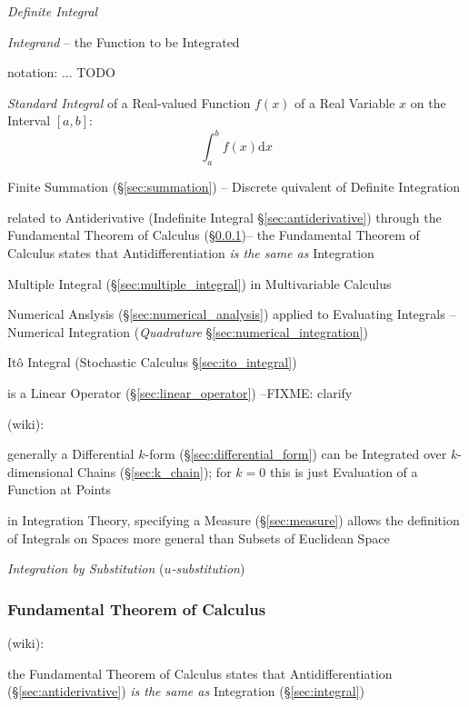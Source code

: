 \emph{Definite Integral}

\emph{Integrand} -- the Function to be Integrated

notation:
... TODO

\emph{Standard Integral} of a Real-valued Function $f(x)$ of a Real Variable $x$
on the Interval $[a,b]$:
\[
  \int_a^b f(x) \mathrm{d}x
\]

\fist Finite Summation (\S\ref{sec:summation}) -- Discrete quivalent of
Definite Integration

\fist related to Antiderivative (Indefinite Integral \S\ref{sec:antiderivative})
through the Fundamental Theorem of Calculus
(\S\ref{sec:fundamental_calculus_theorem})--
the Fundamental Theorem of Calculus states that Antidifferentiation \emph{is the
  same as} Integration

\fist Multiple Integral (\S\ref{sec:multiple_integral}) in Multivariable
Calculus

\fist Numerical Anslysis (\S\ref{sec:numerical_analysis}) applied to Evaluating
Integrals -- Numerical Integration (\emph{Quadrature}
\S\ref{sec:numerical_integration})

\fist It\^o Integral (Stochastic Calculus \S\ref{sec:ito_integral})

is a Linear Operator (\S\ref{sec:linear_operator}) --FIXME: clarify

(wiki):

generally a Differential $k$-form (\S\ref{sec:differential_form}) can be
Integrated over $k$-dimensional Chains (\S\ref{sec:k_chain}); for $k=0$ this is
just Evaluation of a Function at Points

in Integration Theory, specifying a Measure (\S\ref{sec:measure}) allows the
definition of Integrals on Spaces more general than Subsets of Euclidean Space

\asterism

\emph{Integration by Substitution} (\emph{$u$-substitution})



\subsubsection{Fundamental Theorem of Calculus}
\label{sec:fundamental_calculus_theorem}

(wiki):

the Fundamental Theorem of Calculus states that Antidifferentiation
(\S\ref{sec:antiderivative}) \emph{is the
  same as} Integration (\S\ref{sec:integral})

